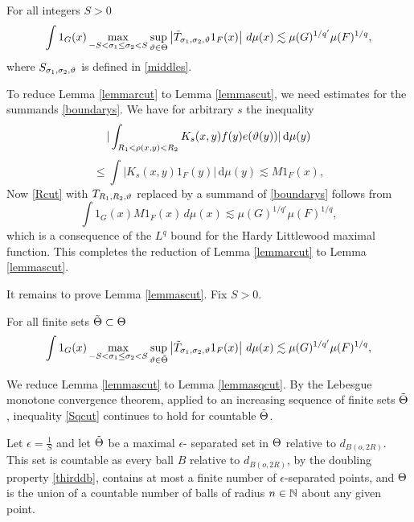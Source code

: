 \begin{lemma}\label{lemmascut}
For all integers $S>0$
    \begin{equation} \label{Scut}
    \int 1_{G}(x)
\max_{-S<\sigma_1\le \sigma_2<S}\sup_{\vartheta\in\Theta}
\left| \Tilde{T}_{\sigma_1,\sigma_2,\vartheta} 1_{F}(x) \right|\, d\mu(x)
\lesssim \mu(G)^{1/q'} \mu(F)^{1/q},
\end{equation}
where $S_{\sigma_1,\sigma_2,\vartheta}$ is defined in \eqref{middles}.
\end{lemma}

To reduce Lemma \ref{lemmarcut} to Lemma \ref{lemmascut},  we need estimates for the summands  \eqref{boundarys}. We have for arbitrary $s$ the inequality
\begin{equation}\label{HLbound}
|\int_{R_1 <  \rho(x,y) < R_2}  K_s(x,y) f(y) e(\vartheta(y))| \,  \mathrm{d}\mu(y)
\end{equation}
\begin{equation}\label{HLbound2}
\le \int   |K_s(x,y) 1_F(y)| \,  \mathrm{d}\mu(y)
\lesssim M1_F(x),
\end{equation}
Now \eqref{Rcut} with $T_{R_1,R_2,\vartheta}$ replaced by a summand of \eqref{boundarys}
follows from
 \begin{equation}
    \int 1_{G}(x) M1_F(x)\, d\mu(x)
\lesssim \mu(G)^{1/q'} \mu(F)^{1/q},
\end{equation}
which is a consequence of
the $L^q$ bound for the Hardy Littlewood maximal function. This completes the reduction of
Lemma \ref{lemmarcut} to Lemma \ref{lemmascut}.


It remains to prove Lemma \ref{lemmascut}. Fix $S>0$.

\begin{lemma}\label{lemmasqcut}
For all finite sets $\tilde{\Theta}\subset \Theta$
    \begin{equation} \label{Sqcut}
    \int 1_{G}(x)
\max_{-S<\sigma_1\le \sigma_2<S}\sup_{\vartheta\in\tilde{\Theta}}
\left| \Tilde{T}_{\sigma_1,\sigma_2,\vartheta} 1_{F}(x) \right|\, d\mu(x)
\lesssim \mu(G)^{1/q'} \mu(F)^{1/q},
\end{equation}
\end{lemma}

We reduce Lemma \ref{lemmascut} to Lemma \ref{lemmasqcut}.
By the Lebesgue monotone convergence theorem,
applied to an increasing sequence of finite sets $\tilde{\Theta}$, inequality \eqref{Sqcut}
continues to hold for  countable $\tilde{\Theta}$.

Let $\epsilon=\frac 1S$ and let $\tilde{\Theta}$ be a maximal $\epsilon$- separated set in $\Theta$ relative to $d_{B(o,2R)}$. This set is countable as  every ball $B$ relative to $d_{B(o,2R)}$, by the doubling property \eqref{thirddb},
contains at most a finite number of $\epsilon$-separated points, and $\Theta$ is the union of a countable number of balls of radius $n\in \mathbb{N}$ about any given point.



